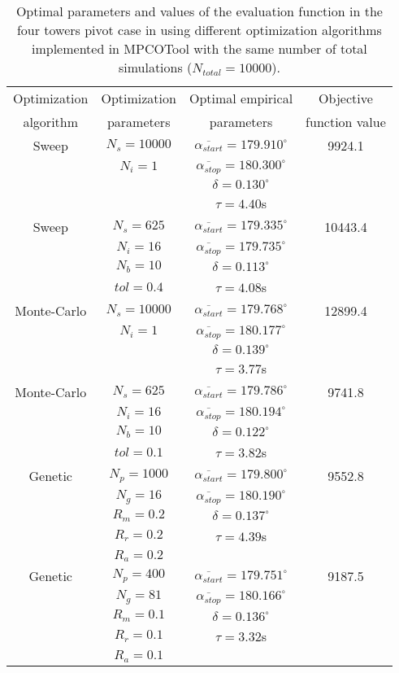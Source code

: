 \documentclass[review,authoryear]{elsarticle}
\newcommand{\TABLE}[5]
{
	\begin{table}[ht!]
		\centering
		\caption{#4.\label{#5}}
		#1
		\begin{tabular}{#2}
			#3
		\end{tabular}
	\end{table}
}
\begin{document}
\TABLE{\scriptsize}{cccc}
{
	Optimization & Optimization & Optimal empirical & Objective
	\\ algorithm & parameters & parameters & function value
	\\ \hline
	Sweep & $N_s=10000$ & $\overline{\alpha_{start}}=179.910^\circ$
	& 9924.1
	\\ & $N_i=1$ & $\overline{\alpha_{stop}}=180.300^\circ$
	\\ & & $\delta=0.130^\circ$
	\\ & & $\tau=4.40$s
	\\ \hline
	Sweep & $N_s=625$ & $\overline{\alpha_{start}}=179.335^\circ$
	& 10443.4
	\\ & $N_i=16$ & $\overline{\alpha_{stop}}=179.735^\circ$
	\\ & $N_b=10$ & $\delta=0.113^\circ$
	\\ & $tol=0.4$ & $\tau=4.08$s
	\\ \hline
	Monte-Carlo & $N_s=10000$
	& $\overline{\alpha_{start}}=179.768^\circ$ & 12899.4
	\\ & $N_i=1$ & $\overline{\alpha_{stop}}=180.177^\circ$
	\\ & & $\delta=0.139^\circ$
	\\ & & $\tau=3.77$s
	\\ \hline
	Monte-Carlo & $N_s=625$
	& $\overline{\alpha_{start}}=179.786^\circ$ & 9741.8
	\\ & $N_i=16$ & $\overline{\alpha_{stop}}=180.194^\circ$
	\\ & $N_b=10$ & $\delta=0.122^\circ$
	\\ & $tol=0.1$ & $\tau=3.82$s
	\\ \hline
	Genetic & $N_p=1000$ & $\overline{\alpha_{start}}=179.800^\circ$
	& 9552.8
	\\ & $N_g=16$ & $\overline{\alpha_{stop}}=180.190^\circ$
	\\ & $R_m=0.2$ & $\delta=0.137^\circ$
	\\ & $R_r=0.2$ & $\tau=4.39$s
	\\ & $R_a=0.2$
	\\ \hline
	Genetic & $N_p=400$ & $\overline{\alpha_{start}}=179.751^\circ$
	& 9187.5
	\\ & $N_g=81$ & $\overline{\alpha_{stop}}=180.166^\circ$
	\\ & $R_m=0.1$ & $\delta=0.136^\circ$
	\\ & $R_r=0.1$ & $\tau=3.32$s
	\\ & $R_a=0.1$
	\\ \hline
}{Optimal parameters and values of the evaluation function in the four towers pivot case in \citet{Ouazaa15} using different optimization algorithms implemented in MPCOTool with the same number of total simulations ($N_{total}=10000$)}{TabPivot}
\end{document}
